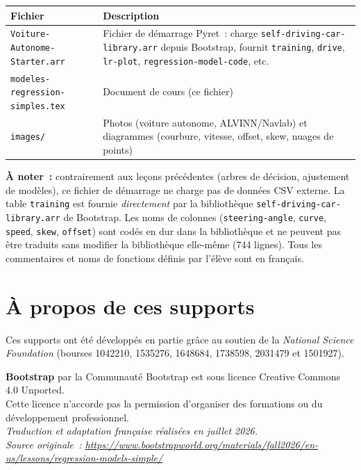 \documentclass[12pt,a4paper]{article}
\begin{document}
\begin{center}
\begin{tabularx}{\textwidth}{l X}
  \toprule
  \textbf{Fichier} & \textbf{Description} \\
  \midrule
  \texttt{Voiture\allowbreak-Autonome\allowbreak-Starter.arr} & Fichier de démarrage Pyret~: charge \texttt{self\allowbreak-driving\allowbreak-car\allowbreak-library.arr} depuis Bootstrap, fournit \texttt{training}, \texttt{drive}, \texttt{lr-plot}, \texttt{regression\allowbreak-model\allowbreak-code}, etc. \\
  \texttt{modeles-regression-simples.tex} & Document de cours (ce fichier) \\
  \texttt{images/} & Photos (voiture autonome, ALVINN/Navlab) et diagrammes (courbure, vitesse, offset, skew, nuages de points) \\
  \bottomrule
\end{tabularx}
\end{center}

\vspace{1em}
\textbf{À noter~:} contrairement aux leçons précédentes (arbres de décision, ajustement de modèles), ce fichier de démarrage ne charge pas de données CSV externe. La table \texttt{training} est fournie \emph{directement} par la bibliothèque \texttt{self-driving-car-library.arr} de Bootstrap. Les noms de colonnes (\texttt{steering-angle}, \texttt{curve}, \texttt{speed}, \texttt{skew}, \texttt{offset}) sont codés en dur dans la bibliothèque et ne peuvent pas être traduits sans modifier la bibliothèque elle-même (744 lignes). Tous les commentaires et noms de fonctions définis par l'élève sont en français.

\section*{À propos de ces supports}

Ces supports ont été développés en partie grâce au soutien de la \emph{National Science Foundation} (bourses 1042210, 1535276, 1648684, 1738598, 2031479 et 1501927).

\begin{center}
  \textbf{Bootstrap} par la Communauté Bootstrap est sous licence Creative Commons 4.0 Unported.\\
  Cette licence n'accorde pas la permission d'organiser des formations ou du développement professionnel.\\[1em]
  \textit{Traduction et adaptation française réalisées en juillet 2026.}\\
  \textit{Source originale~: \url{https://www.bootstrapworld.org/materials/fall2026/en-us/lessons/regression-models-simple/}}
\end{center}
\end{document}
